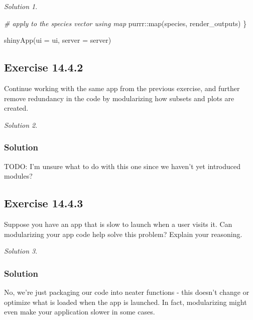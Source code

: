 \documentclass[
]{book}
\newenvironment{Shaded}{\begin{snugshade}}{\end{snugshade}}
\newcommand{\AttributeTok}[1]{\textcolor[rgb]{0.77,0.63,0.00}{#1}}
\newcommand{\CommentTok}[1]{\textcolor[rgb]{0.56,0.35,0.01}{\textit{#1}}}
\newcommand{\FunctionTok}[1]{\textcolor[rgb]{0.00,0.00,0.00}{#1}}
\newcommand{\NormalTok}[1]{#1}
\newcommand{\SpecialCharTok}[1]{\textcolor[rgb]{0.00,0.00,0.00}{#1}}
\theoremstyle{definition}
\theoremstyle{definition}
\theoremstyle{definition}
\theoremstyle{definition}
\theoremstyle{remark}
\newtheorem*{solution}{Solution}
\begin{document}
\begin{solution}
\begin{Shaded}
\begin{Highlighting}[]
    \CommentTok{\# apply to the species vector using map}
\NormalTok{    purrr}\SpecialCharTok{::}\FunctionTok{map}\NormalTok{(species, render\_outputs)}
\NormalTok{\}}

\FunctionTok{shinyApp}\NormalTok{(}\AttributeTok{ui =}\NormalTok{ ui, }\AttributeTok{server =}\NormalTok{ server)}
\end{Highlighting}
\end{Shaded}

\end{solution}

\hypertarget{exercise-14.4.2}{%
\subsection*{Exercise 14.4.2}\label{exercise-14.4.2}}

Continue working with the same app from the previous exercise, and further remove redundancy in the code by modularizing how subsets and plots are created.

\begin{solution}
\leavevmode

\hypertarget{solution-44}{%
\subsubsection*{Solution}\label{solution-44}}

TODO: I'm unsure what to do with this one since we haven't yet introduced modules?

\end{solution}

\hypertarget{exercise-14.4.3}{%
\subsection*{Exercise 14.4.3}\label{exercise-14.4.3}}

Suppose you have an app that is slow to launch when a user visits it. Can
modularizing your app code help solve this problem? Explain your reasoning.

\begin{solution}
\leavevmode

\hypertarget{solution-45}{%
\subsubsection*{Solution}\label{solution-45}}

No, we're just packaging our code into neater functions - this doesn't change or optimize what is loaded when the app is launched. In fact, modularizing might even make your application slower in some cases.

\end{solution}
\end{document}
